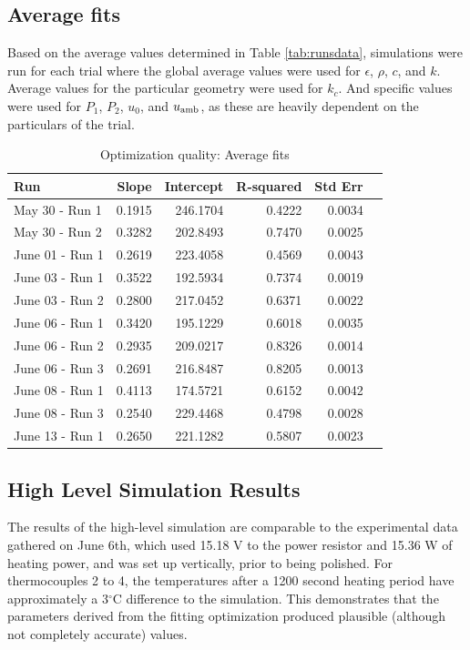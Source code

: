 \documentclass[letterpaper,titlepage,oneside]{report}
\begin{document}
\subsection*{Average fits}
Based on the average values determined in Table \ref{tab:runsdata},
simulations were run for each trial where the global average values
were used for ${\epsilon}$, ${\rho}$, ${c}$, and ${k}$.
Average values for the particular geometry were used for $k_c$. And
specific values were used for ${P_1}$, ${P_2}$, ${u_0}$,
and ${u_{\rm{amb}}}$, as these are heavily dependent on the particulars
of the trial.

\begin{table}[H]
  \caption{Optimization quality: Average fits}
  \label{tab:optavg}
  \centering
  \begin{tabularx}{0.75\textwidth}{|X|r|r|r|r|r|}
    \hline
    Run & Slope & Intercept & R-squared & Std Err \\
    \hline
    May  30 - Run 1   &   0.1915   & 246.1704   &    0.4222   &   0.0034 \\
    May  30 - Run 2   &   0.3282   & 202.8493   &    0.7470   &   0.0025 \\
    June 01 - Run 1   &   0.2619   & 223.4058   &    0.4569   &   0.0043 \\
    June 03 - Run 1   &   0.3522   & 192.5934   &    0.7374   &   0.0019 \\
    June 03 - Run 2   &   0.2800   & 217.0452   &    0.6371   &   0.0022 \\
    June 06 - Run 1   &   0.3420   & 195.1229   &    0.6018   &   0.0035 \\
    June 06 - Run 2   &   0.2935   & 209.0217   &    0.8326   &   0.0014 \\
    June 06 - Run 3   &   0.2691   & 216.8487   &    0.8205   &   0.0013 \\
    June 08 - Run 1   &   0.4113   & 174.5721   &    0.6152   &   0.0042 \\
    June 08 - Run 3   &   0.2540   & 229.4468   &    0.4798   &   0.0028 \\
    June 13 - Run 1   &   0.2650   & 221.1282   &    0.5807   &   0.0023 \\
    \hline
  \end{tabularx}
\end{table}

\subsection*{High Level Simulation Results}
The results of the high-level simulation are comparable to the
experimental data gathered on June 6th, which used 15.18 V
to the power resistor and 15.36 W of heating power, and was set
up vertically, prior to being polished. For thermocouples 2 to
4, the temperatures after a 1200 second heating period have
approximately a 3$^{\circ}$C difference to the simulation.
This demonstrates that the parameters derived from the fitting
optimization produced plausible (although not completely
accurate) values.
\end{document}
